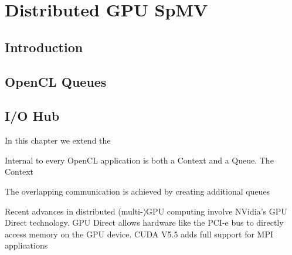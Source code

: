 

\chapter{Distributed GPU SpMV}
\label{chap:multigpu_rbffd}




\section{Introduction}



\section{OpenCL Queues}
\section{I/O Hub}
\cite{Spafford2011} 

In this chapter we extend the 

Internal to every OpenCL application is both a Context and a Queue. The Context 

The overlapping communication is achieved by creating additional queues 


Recent advances in distributed (multi-)GPU computing involve NVidia's GPU Direct technology. GPU Direct allows hardware like the PCI-e bus to directly access memory on the GPU device. CUDA V5.5 adds full support for MPI applications 



